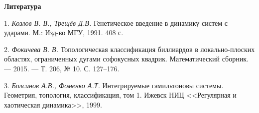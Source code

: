 \smallskip \centerline{\bf Литература}\nopagebreak

1. {\it  Козлов В. В., Трещёв Д.В.} Генетическое введение в динамику систем с ударами. М.:  Изд-во МГУ, 1991. 408 с.

2. {\it Фокичева В. В.} Топологическая классификация биллиардов в локально-плоских областях, ограниченных дугами софокусных квадрик. Математический сборник. — 2015. — Т. 206, № 10. С. 127–176.

3. {\it Болсинов А.В., Фоменко А.Т.} Интегрируемые гамильтоновы системы. Геометрия, топология, классификация, том 1. Ижевск НИЦ <<Регулярная и хаотическая динамика>>, 1999.

